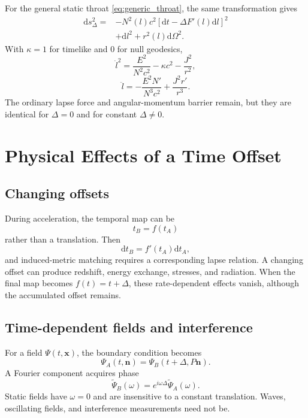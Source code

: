 \documentclass[journal,a4paper]{IEEEtran}
\begin{document}
For the general static throat \eqref{eq:generic_throat}, the same transformation gives
\begin{equation}
\begin{split}
\mathrm{d}s_\Delta^2={}&
-N^2(l)c^2[\mathrm{d}t-\Delta F'(l)\mathrm{d}l]^2\\
&+\mathrm{d}l^2+r^2(l)\mathrm{d}\Omega^2.
\end{split}
\end{equation}
With \(\kappa=1\) for timelike and \(0\) for null geodesics,
\begin{equation}
    \dot l^2
    =\frac{E^2}{N^2c^2}
    -\kappa c^2
    -\frac{J^2}{r^2},
\end{equation}
\begin{equation}
    \ddot l
    =-\frac{E^2N'}{N^3c^2}
    +\frac{J^2r'}{r^3}.
\end{equation}
The ordinary lapse force and angular-momentum barrier remain, but they are identical for \(\Delta=0\) and for constant \(\Delta\neq0\).

\section{Physical Effects of a Time Offset}
\label{sec:time_effects}

\subsection{Changing offsets}

During acceleration, the temporal map can be
\begin{equation}
    t_B=f(t_A)
\end{equation}
rather than a translation. Then
\begin{equation}
    \mathrm{d}t_B=f'(t_A)\mathrm{d}t_A,
\end{equation}
and induced-metric matching requires a corresponding lapse relation. A changing offset can produce redshift, energy exchange, stresses, and radiation. When the final map becomes \(f(t)=t+\Delta\), these rate-dependent effects vanish, although the accumulated offset remains.

\subsection{Time-dependent fields and interference}

For a field \(\Psi(t,\mathbf x)\), the boundary condition becomes
\begin{equation}
    \Psi_A(t,\mathbf n)
    =\Psi_B(t+\Delta,P\mathbf n).
\end{equation}
A Fourier component acquires phase
\begin{equation}
    \widetilde\Psi_B(\omega)
    =e^{i\omega\Delta}\widetilde\Psi_A(\omega).
\end{equation}
Static fields have \(\omega=0\) and are insensitive to a constant translation. Waves, oscillating fields, and interference measurements need not be.
\end{document}
